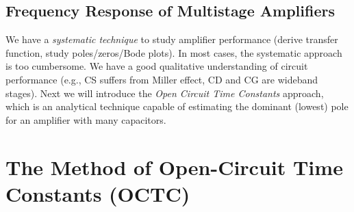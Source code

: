 \subsection{Frequency Response of Multistage Amplifiers}
We have a \textit{systematic technique} to study amplifier performance (derive transfer function, study poles/zeros/Bode plots).  In most cases, the systematic approach is too cumbersome. We have a good qualitative understanding of circuit performance (e.g., CS suffers from Miller effect, CD and CG are wideband stages).  Next we will introduce the \textit{Open Circuit Time Constants} approach, which is an analytical technique capable of estimating  the dominant (lowest) pole for an amplifier with many capacitors.
\section{The Method of Open-Circuit Time Constants (OCTC)}
